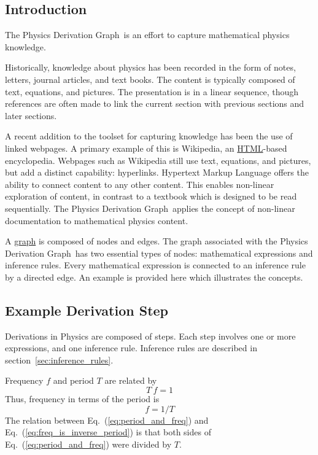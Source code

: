 \documentclass{article}
\newcommand{\eqn}[1]{Eq.\ (\ref{#1})}
\newcommand{\pdg}{Physics Derivation Graph}
\begin{document}
\begin{multicols}{2}

\tableofcontents



\section{Introduction\label{sec:intro}}

The \pdg\ is an effort to capture mathematical physics knowledge. 

Historically, knowledge about physics has been recorded in the form of notes, letters, journal articles, and text books. 
The content is typically composed of text, equations, and pictures. 
The presentation is in a linear sequence, though references are often made to link the current section with previous sections and later sections. 

A recent addition to the toolset for capturing knowledge has been the use of linked webpages. 
A primary example of this is Wikipedia, an \href{https://en.wikipedia.org/wiki/HTML}{HTML}-based encyclopedia. 
Webpages such as Wikipedia still use text, equations, and pictures, but add a distinct capability: hyperlinks. 
Hypertext Markup Language offers the ability to connect content to any other content. 
This enables non-linear exploration of content, in contrast to a textbook which is designed to be read sequentially. 
The \pdg\ applies the concept of non-linear documentation to mathematical physics content. 

A \href{https://en.wikipedia.org/wiki/Graph_(mathematics)}{graph} is composed of nodes and edges. The graph associated with the \pdg\ has two essential types of nodes: mathematical expressions and inference rules. Every mathematical expression is connected to an inference rule by a directed edge. An example is provided here which illustrates the concepts.

\subsection{Example Derivation Step\label{sec:example}}
Derivations in Physics are composed of steps. 
Each step involves one or more expressions, and one inference rule. 
Inference rules are described in section~\ref{sec:inference_rules}. 

Frequency $f$ and period $T$ are related by
\begin{equation}
T\ f = 1
\label{eq:period_and_freq}
\end{equation}
Thus, frequency in terms of the period is
\begin{equation}
f = 1/T
\label{eq:freq_is_inverse_period}
\end{equation}
The relation between \eqn{eq:period_and_freq} and \eqn{eq:freq_is_inverse_period} is that both sides of \eqn{eq:period_and_freq} were divided by $T$. 


\end{multicols}
\end{document}
